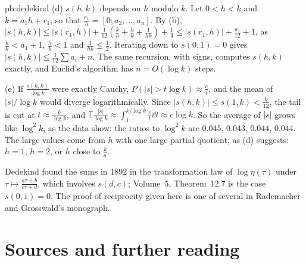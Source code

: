 \begin{solution}{pb:dedekind}
(d) $s(h,k)$ depends on $h$ modulo $k$. Let $0<h<k$ and $k=a_1h+r_1$, so that $\frac{r_1}h=[0;a_2,\dots,a_n]$. By (b),
$|s(h,k)|\le|s(r_1,h)|+\frac1{12}(\frac kh+\frac hk+\frac1{hk})+\frac14\le|s(r_1,h)|+\frac{a_1}{12}+1$, as $\frac kh<a_1+1$, $\frac hk<1$ and $\frac1{hk}\le\frac12$. Iterating down to $s(0,1)=0$ gives
$|s(h,k)|\le\frac1{12}\sum a_i+n$. The same recursion, with signs, computes $s(h,k)$ exactly, and Euclid's algorithm has $n=O(\log k)$ steps.

(e) If $\frac{s(h,k)}{\log k}$ were exactly Cauchy, $P(|s|>t\log k)\approx\frac c t$, and the mean of $|s|/\log k$ would diverge logarithmically. Since $|s(h,k)|\le s(1,k)<\frac k{12}$, the tail is cut
at $t\approx\frac k{\log k}$, and $\mathbb E\frac{|s|}{\log k}\approx\int_1^{k/\log k}\frac c t\dd t\approx c\log k$. So the average of $|s|$ grows like $\log^2k$, as the data show: the ratios to
$\log^2k$ are $0.045$, $0.043$, $0.044$, $0.044$. The large values come from $h$ with one large partial quotient, as (d) suggests: $h=1$, $h=2$, or $h$ close to $\frac ka$.


\leads Dedekind found the sums in 1892 in the transformation law of $\log\eta(\tau)$ under $\tau\mapsto\frac{a\tau+b}{c\tau+d}$, which involves $s(d,c)$; Volume~5, Theorem~12.7 is the case
$s(0,1)=0$. The proof of reciprocity given here is one of several in Rademacher and Grosswald's monograph.
\end{solution}

\section*{Sources and further reading}

